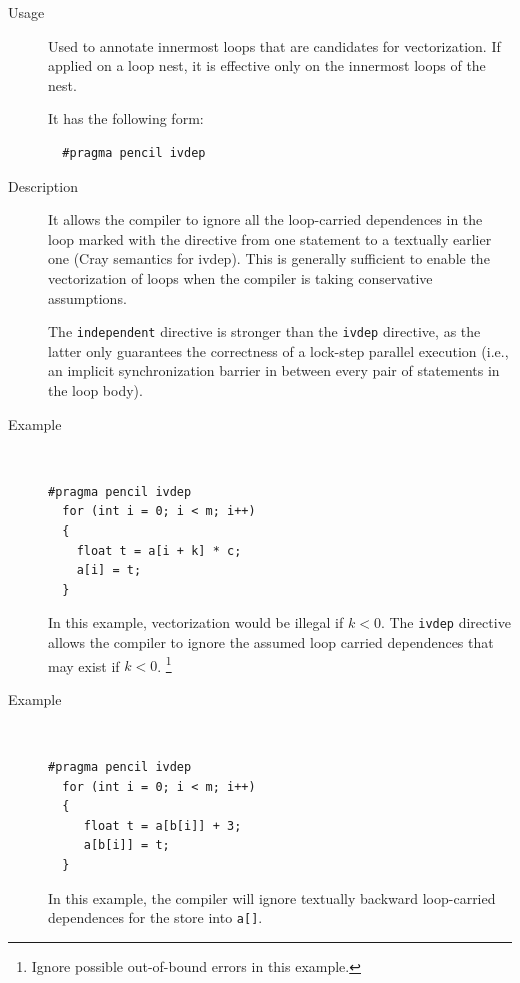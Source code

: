 \documentclass{carp}
\newcommand\pencil{\textsc{Pencil}\xspace}
\begin{document}
\begin{description}
\item [Usage] Used to annotate innermost loops that are candidates
  for vectorization.  If applied on a loop nest, it is effective only on
  the innermost loops of the nest.

  It has the following form:
  \begin{lstlisting}
  #pragma pencil ivdep
  \end{lstlisting}
\item [Description] It allows the
  compiler to ignore all the loop-carried dependences in the loop marked with
  the directive from one statement to a textually earlier one (Cray semantics for ivdep).
  This is generally sufficient to enable the vectorization
  of loops when the compiler is taking conservative assumptions.

  The \lstinline!independent!  directive is stronger than the
  \lstinline!ivdep! directive, as the latter only guarantees the
  correctness of a lock-step parallel execution (i.e., an implicit
  synchronization barrier in between every pair of statements in the loop
  body).
  
  \item [Example]~

  \begin{lstlisting}[language=pencil]
  #pragma pencil ivdep
  for (int i = 0; i < m; i++)
  {
    float t = a[i + k] * c;
    a[i] = t;
  }
  \end{lstlisting}
  In this example, vectorization would be illegal if $k < 0$.  The
  \lstinline!ivdep! directive allows the compiler to ignore the assumed
  loop carried dependences that may exist if $k < 0$. \footnote{Ignore
  possible out-of-bound errors in this example.}
  \item [Example]~
  \begin{lstlisting}[language=pencil]
  #pragma pencil ivdep
  for (int i = 0; i < m; i++)
  {
     float t = a[b[i]] + 3;
     a[b[i]] = t;
  }
  \end{lstlisting}
  In this example, the compiler will ignore textually backward
  loop-carried dependences for the store into \lstinline!a[]!.
\end{description}
%
\end{document}
